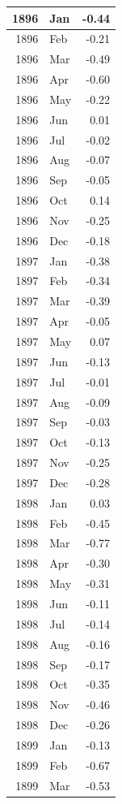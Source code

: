 \documentclass[
]{article}
\begin{document}
\begin{table}[H]
\begin{tabular}[t]{r|l|r}
\hline
1896 & Jan & -0.44\\
\hline
1896 & Feb & -0.21\\
\hline
1896 & Mar & -0.49\\
\hline
1896 & Apr & -0.60\\
\hline
1896 & May & -0.22\\
\hline
1896 & Jun & 0.01\\
\hline
1896 & Jul & -0.02\\
\hline
1896 & Aug & -0.07\\
\hline
1896 & Sep & -0.05\\
\hline
1896 & Oct & 0.14\\
\hline
1896 & Nov & -0.25\\
\hline
1896 & Dec & -0.18\\
\hline
1897 & Jan & -0.38\\
\hline
1897 & Feb & -0.34\\
\hline
1897 & Mar & -0.39\\
\hline
1897 & Apr & -0.05\\
\hline
1897 & May & 0.07\\
\hline
1897 & Jun & -0.13\\
\hline
1897 & Jul & -0.01\\
\hline
1897 & Aug & -0.09\\
\hline
1897 & Sep & -0.03\\
\hline
1897 & Oct & -0.13\\
\hline
1897 & Nov & -0.25\\
\hline
1897 & Dec & -0.28\\
\hline
1898 & Jan & 0.03\\
\hline
1898 & Feb & -0.45\\
\hline
1898 & Mar & -0.77\\
\hline
1898 & Apr & -0.30\\
\hline
1898 & May & -0.31\\
\hline
1898 & Jun & -0.11\\
\hline
1898 & Jul & -0.14\\
\hline
1898 & Aug & -0.16\\
\hline
1898 & Sep & -0.17\\
\hline
1898 & Oct & -0.35\\
\hline
1898 & Nov & -0.46\\
\hline
1898 & Dec & -0.26\\
\hline
1899 & Jan & -0.13\\
\hline
1899 & Feb & -0.67\\
\hline
1899 & Mar & -0.53\\

\end{tabular}
\end{table}
\end{document}
